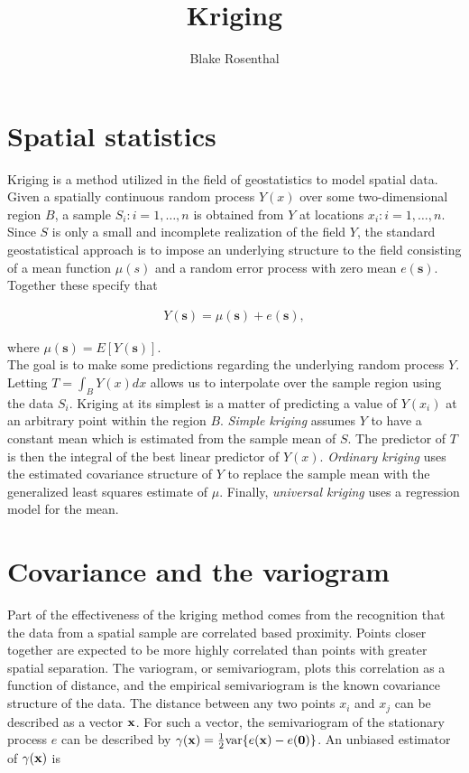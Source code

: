 \documentclass[12pt]{amsart}
\title{Kriging}
\author{Blake Rosenthal}
\date{}
\begin{document}
\maketitle
\pagestyle{empty}

\section{Spatial statistics}
Kriging is a method utilized in the field of geostatistics to model spatial data. Given a spatially continuous random process $Y(x)$ over some two-dimensional region $B$, a sample $S_i: i=1, \dots, n$ is obtained from $Y$ at locations $x_i: i=1, \dots, n$. Since $S$ is only a small and incomplete realization of the field $Y$, the standard geostatistical approach is to impose an underlying structure to the field consisting of a mean function $\mu(s)$ and a random error process with zero mean $e(\mathbf{s})$. Together these specify that 

\begin{align*}
Y(\mathbf{s}) = \mu(\mathbf{s}) + e(\mathbf{s}),
\end{align*}

where $\mu(\mathbf{s}) = E[Y(\mathbf{s})]$.
  \\

The goal is to make some predictions regarding the underlying random process $Y$. Letting $T = \int_BY(x)dx$ allows us to interpolate over the sample region using the data $S_i$. Kriging at its simplest is a matter of predicting a value of $Y(x_i)$ at an arbitrary point within the region $B$. \emph{Simple kriging} assumes $Y$ to have a constant mean which is estimated from the sample mean of $S$. The predictor of $T$ is then the integral of the best linear predictor of $Y(x)$. \emph{Ordinary kriging} uses the estimated covariance structure of $Y$ to replace the sample mean with the generalized least squares estimate of $\mu$. Finally, \emph{universal kriging} uses a regression model for the mean. 

\section{Covariance and the variogram}
Part of the effectiveness of the kriging method comes from the recognition that the data from a spatial sample are correlated based proximity. Points closer together are expected to be more highly correlated than points with greater spatial separation. The variogram, or semivariogram, plots this correlation as a function of distance, and the empirical semivariogram is the known covariance structure of the data. The distance between any two points $x_i$ and $x_j$ can be described as a vector $\bold{x}$. For such a vector, the semivariogram of the stationary process $e$ can be described by $\gamma(\bold{x}) = {1\over 2} \text{var} \{ e(\bold{x}) - e(\bold{0}) \}$. An unbiased estimator of $\gamma(\bold{x})$ is
\end{document}
